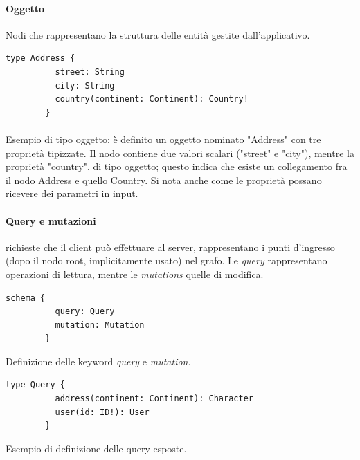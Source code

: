 \documentclass[a4paper, 12pt]{report}
\begin{document}
      \paragraph*{Oggetto} Nodi che rappresentano la struttura delle entità gestite dall'applicativo.
      \begin{Verbatim}[samepage=true]
        type Address {
          street: String
          city: String
          country(continent: Continent): Country!
        }
      \end{Verbatim}
      \paragraph*{}
      Esempio di tipo oggetto: è definito un oggetto nominato "Address" con tre proprietà tipizzate.
      Il nodo contiene due valori scalari ("street" e "city"), mentre la proprietà "country", di tipo oggetto; questo indica che esiste un collegamento fra il nodo Address e quello Country. Si nota anche come le proprietà possano ricevere dei parametri in input.
      \paragraph*{Query e mutazioni} richieste che il client può effettuare al server, rappresentano i punti d'ingresso (dopo il nodo root, implicitamente usato) nel grafo. Le \emph{query} rappresentano operazioni di lettura, mentre le \emph{mutations} quelle di modifica.
      \begin{Verbatim}[samepage=true]
        schema {
          query: Query
          mutation: Mutation
        }
      \end{Verbatim}
      Definizione delle keyword \emph{query} e \emph{mutation}.
      \begin{Verbatim}[samepage=true]
        type Query {
          address(continent: Continent): Character
          user(id: ID!): User
        }
      \end{Verbatim}
      Esempio di definizione delle query esposte.
\end{document}

